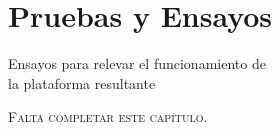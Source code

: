 \section{Pruebas y Ensayos} \label{ensayos}
\thispagestyle{plain}

\vspace{0.5cm}

\Large\scshape
\begin{center}
    {\Medium Ensayos para relevar el funcionamiento de\\ la plataforma resultante}
\end{center}
\normalfont

\divider

{\scshape\Large\Bold Falta completar este capítulo.}\\

